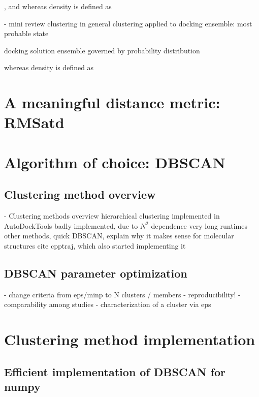 , and  whereas density is defined as





    -  mini review
        clustering in general
        clustering applied to docking ensemble: most probable state




docking solution ensemble governed by probability distribution





whereas density is defined as



\cite{tan_data_mining}


\section{A meaningful distance metric: RMSatd}

\section{Algorithm of choice: DBSCAN}

\subsection{Clustering method overview}

    - Clustering methods overview
        hierarchical clustering implemented in AutoDockTools
            badly implemented, due to $N^2$ dependence very long runtimes
        other methods, quick
        DBSCAN, explain why it makes sense for molecular structures
        cite cpptraj, which also started implementing it

\subsection{DBSCAN parameter optimization}

    - change criteria from eps/minp to N clusters / members
    - reproducibility!
    - comparability among studies
    - characterization of a cluster via eps


\section{Clustering method implementation}

\subsection{Efficient implementation of DBSCAN for numpy}


